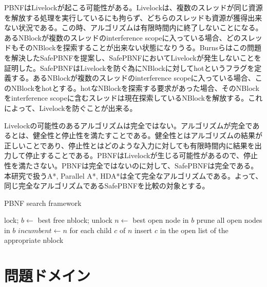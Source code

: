 \documentclass[uplatex]{jsarticle}
\begin{document}
PBNFはLivelockが起こる可能性がある。Livelockは、複数のスレッドが同じ資源を解放する処理を実行しているにも拘らず、どちらのスレッドも資源が獲得出来ない状況である。この時、アルゴリズムは有限時間内に終了しないことになる。あるNBlockが複数のスレッドのinterference scopeに入っている場合、どのスレッドもそのNBlockを探索することが出来ない状態になりうる。Burnsらはこの問題を解決したSafePBNFを提案し、SafePBNFにおいてLivelockが発生しないことを証明した。SafePBNFはLivelockを防ぐ為にNBlockに対してhotというフラグを定義する。あるNBlockが複数のスレッドのinterference scopeに入っている場合、このNBlockをhotとする。hotなNBlockを探索する要求があった場合、そのNBlockをinterference scopeに含むスレッドは現在探索しているNBlockを解放する。これによって、Livelockを防ぐことが出来る。
\newline

Livelockの可能性のあるアルゴリズムは完全ではない。アルゴリズムが完全であるとは、健全性と停止性を満たすことである。健全性とはアルゴリズムの結果が正しいことであり、停止性とはどのような入力に対しても有限時間内に結果を出力して停止することである。PBNFはLivelockが生じる可能性があるので、停止性を満たさない。PBNFは完全ではないのに対して、SafePBNFは完全である。本研究で扱うA*, Parallel A*, HDA*は全て完全なアルゴリズムである。よって、同じ完全なアルゴリズムであるSafePBNFを比較の対象とする。

\begin{algorithm}                      
\caption{PBNF search framework}         
\label{alg:pbnf}                          
\begin{algorithmic}                  
	\STATE lock; $b \leftarrow$ best free nblock; unlock
		\STATE $n \leftarrow$ best open node in $b$
			\STATE prune all open nodes in $b$
			\STATE $incumbent \leftarrow n$
		\ELSE 
			\STATE for each child $c$ of $n$
			\STATE insert $c$ in the open list of the appropriate nblock
		\ENDIF
\ENDWHILE
\ENDWHILE
\end{algorithmic}
\end{algorithm}



\section{問題ドメイン}
\label{sec:domain}
\end{document}
